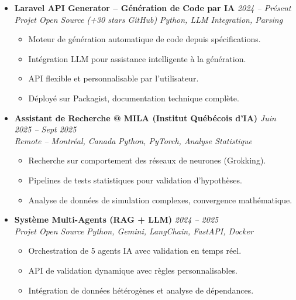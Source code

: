 \documentclass[a4paper,11pt]{article}
\begin{document}
\begin{itemize}[leftmargin=*, label={-}]
\item \textbf{Laravel API Generator -- Génération de Code par IA} \hfill \textit{2024 -- Présent} \\
\textit{Projet Open Source (+30 stars GitHub)} \hfill \textit{Python, LLM Integration, Parsing}
\vspace{-2pt}
    \begin{itemize}[leftmargin=0.4cm, nosep, label=\tiny$\bullet$]
        \item \small{Moteur de génération automatique de code depuis spécifications.}
        \item \small{Intégration LLM pour assistance intelligente à la génération.}
        \item \small{API flexible et personnalisable par l'utilisateur.}
        \item \small{Déployé sur Packagist, documentation technique complète.}
    \end{itemize}
\vspace{3pt}

\item \textbf{Assistant de Recherche @ MILA (Institut Québécois d'IA)} \hfill \textit{Juin 2025 -- Sept 2025} \\
\textit{Remote -- Montréal, Canada} \hfill \textit{Python, PyTorch, Analyse Statistique}
\vspace{-2pt}
    \begin{itemize}[leftmargin=0.4cm, nosep, label=\tiny$\bullet$]
        \item \small{Recherche sur comportement des réseaux de neurones (Grokking).}
        \item \small{Pipelines de tests statistiques pour validation d'hypothèses.}
        \item \small{Analyse de données de simulation complexes, convergence mathématique.}
    \end{itemize}
\vspace{3pt}

\item \textbf{Système Multi-Agents (RAG + LLM)} \hfill \textit{2024 -- 2025} \\
\textit{Projet Open Source} \hfill \textit{Python, Gemini, LangChain, FastAPI, Docker}
\vspace{-2pt}
    \begin{itemize}[leftmargin=0.4cm, nosep, label=\tiny$\bullet$]
        \item \small{Orchestration de 5 agents IA avec validation en temps réel.}
        \item \small{API de validation dynamique avec règles personnalisables.}
        \item \small{Intégration de données hétérogènes et analyse de dépendances.}
    \end{itemize}
\vspace{3pt}


\end{itemize}
\end{document}
